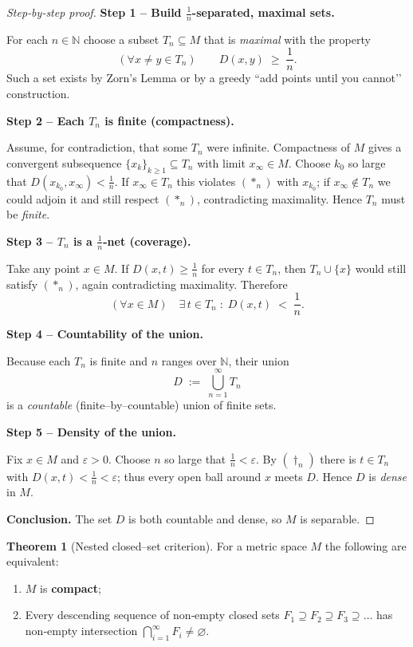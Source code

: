 \documentclass[12pt]{article}
\theoremstyle{definition} %
\newtheorem{theorem}{Theorem}
\theoremstyle{plain} %
\begin{document}
  \begin{proof}[Step‑by‑step proof]
  \textbf{Step 1 – Build \(\tfrac1n\)-separated, maximal sets.}\par
  For each \(n\in\mathbb N\) choose a subset \(T_n\subseteq M\) that is
  \emph{maximal} with the property
  \[
      (\forall x\neq y\in T_n)\qquad D(x,y)\;\ge\;\frac1n.
      \tag{$\ast_n$}
  \]
  Such a set exists by Zorn’s Lemma or by a greedy “add points until you
  cannot’’ construction.
  
  \medskip
  \textbf{Step 2 – Each \(T_n\) is finite (compactness).}\par
  Assume, for contradiction, that some \(T_n\) were infinite.
  Compactness of \(M\) gives a convergent subsequence
  \(\{x_k\}_{k\ge1}\subseteq T_n\) with limit \(x_\infty\in M\).
  Choose \(k_0\) so large that \(D(x_{k_0},x_\infty)<\tfrac1n\).
  If \(x_\infty\in T_n\) this violates \((\ast_n)\) with \(x_{k_0}\);  
  if \(x_\infty\notin T_n\) we could adjoin it and still respect
  \((\ast_n)\), contradicting maximality.  
  Hence \(T_n\) must be \emph{finite}.
  
  \medskip
  \textbf{Step 3 – \(T_n\) is a \(\tfrac1n\)-net (coverage).}\par
  Take any point \(x\in M\).  
  If \(D(x,t)\ge\tfrac1n\) for every \(t\in T_n\), then \(T_n\cup\{x\}\)
  would still satisfy \((\ast_n)\), again contradicting maximality.
  Therefore
  \[
      (\forall x\in M)\quad
      \exists\,t\in T_n\;:\;D(x,t)\;<\;\frac1n.
      \tag{$\dagger_n$}
  \]
  
  \medskip
  \textbf{Step 4 – Countability of the union.}\par
  Because each \(T_n\) is finite and \(n\) ranges over \(\mathbb N\),
  their union
  \[
      D\;:=\;\bigcup_{n=1}^\infty T_n
  \]
  is a \emph{countable} (finite–by–countable) union of finite sets.
  
  \medskip
  \textbf{Step 5 – Density of the union.}\par
  Fix \(x\in M\) and \(\varepsilon>0\).  
  Choose \(n\) so large that \(\tfrac1n<\varepsilon\).
  By \((\dagger_n)\) there is \(t\in T_n\) with \(D(x,t)<\tfrac1n<\varepsilon\);  
  thus every open ball around \(x\) meets \(D\).  
  Hence \(D\) is \emph{dense} in \(M\).
  
  \medskip
  \textbf{Conclusion.}\;
  The set \(D\) is both countable and dense, so \(M\) is separable.
  \end{proof}

\begin{theorem}[Nested closed–set criterion]\label{thm:nested_closed_compact}
  For a metric space $M$ the following are equivalent:
  \begin{enumerate}[label=\textup{(\alph*)}]
      \item $M$ is \textbf{compact};
      \item Every descending sequence of non‑empty closed sets
            \(
                F_1\supseteq F_2\supseteq F_3\supseteq\dots
            \)
            has non‑empty intersection
            $\displaystyle\bigcap_{i=1}^{\infty}F_i\ne\varnothing$.
  \end{enumerate}
\end{theorem}
\end{document}
